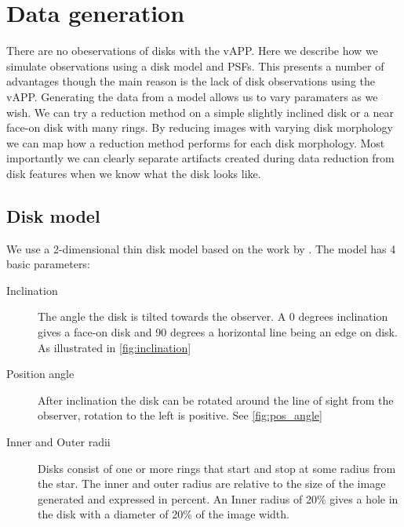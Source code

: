 
\chapter{Data generation} %
\label{ch:data_gen} %

There are no obeservations of disks with the \ac{vAPP}. Here we describe how we simulate observations using a disk model and \acp{PSF}. This presents a number of advantages though the main reason is the lack of disk observations using the \ac{vAPP}. Generating the data from a model allows us to vary paramaters as we wish. We can try a reduction method on a simple slightly inclined disk or a near face-on disk with many rings. By reducing images with varying disk morphology we can map how a reduction method performs for each disk morphology. Most importantly we can clearly separate artifacts created during data reduction from disk features when we know what the disk looks like.




\section{Disk model}
We use a 2-dimensional thin disk model based on the work by \cite{Pieter_Okko}. The model has 4 basic parameters: 

\begin{description}
\item[Inclination] The angle the disk is tilted towards the observer. A 0 degrees inclination gives a face-on disk and 90 degrees a horizontal line being an edge on disk. As illustrated in \autoref{fig:inclination}
\item[Position angle] After inclination the disk can be rotated around the line of sight from the observer, rotation to the left is positive. See \autoref{fig:pos_angle}
\item[Inner and Outer radii] Disks consist of one or more rings that start and stop at some radius from the star. The inner and outer radius are relative to the size of the image generated and expressed in percent. An Inner radius of 20\% gives a hole in the disk with a diameter of 20\% of the image width. %
\end{description}

